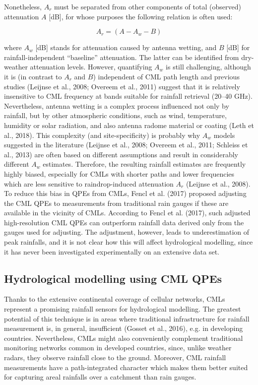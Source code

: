 \documentclass{ctuthesis}\usepackage[]{graphicx}\usepackage[]{color}
\begin{document}
Nonetheless, $A_r$ must be separated from other components of total (observed) attenuation $A$ [dB], for whose purposes the following relation is often used: 

\begin{equation} \label{2eq2}
A_r = (A - A_w - B)
\end{equation}

where $A_w$ [dB] stands for attenuation caused by antenna wetting, and $B$ [dB] for rainfall-independent \enquote{baseline} attenuation. The latter can be identified from dry-weather attenuation levels. However, quantifying $A_w$ is still challenging, although it is (in contrast to $A_r$ and $B$) independent of CML path length and previous studies (Leijnse et al., 2008; Overeem et al., 2011) suggest that it is relatively insensitive to CML frequency at bands suitable for rainfall retrieval (20--40 GHz). Nevertheless, antenna wetting is a complex process influenced not only by rainfall, but by other atmospheric conditions, such as wind, temperature, humidity or solar radiation, and also antenna radome material or coating (Leth et al., 2018). This complexity (and site-specificity) is probably why $A_w$ models suggested in the literature (Leijnse et al., 2008; Overeem et al., 2011; Schleiss et al., 2013) are often based on different assumptions and result in considerably different $A_w$ estimates. Therefore, the resulting rainfall estimates are frequently highly biased, especially for CMLs with shorter paths and lower frequencies which are less sensitive to raindrop-induced attenuation $A_r$ (Leijnse et al., 2008). To reduce this bias in QPEs from CMLs, Fencl et al. (2017) proposed adjusting the CML QPEs to measurements from traditional rain gauges if these are available in the vicinity of CMLs. According to Fencl et al. (2017), such adjusted high-resolution CML QPEs can outperform rainfall data derived only from the gauges used for adjusting. The adjustment, however, leads to underestimation of peak rainfalls, and it is not clear how this will affect hydrological modelling, since it has never been investigated experimentally on an extensive data set.

\subsection{Hydrological modelling using CML QPEs}

Thanks to the extensive continental coverage of cellular networks, CMLs represent a promising rainfall sensors for hydrological modelling. The greatest potential of this technique is in areas where traditional infrastructure for rainfall measurement is, in general, insufficient (Gosset et al., 2016), e.g. in developing countries. Nevertheless, CMLs might also conveniently complement traditional monitoring networks common in developed countries, since, unlike weather radars, they observe rainfall close to the ground. Moreover, CML rainfall measurements have a path-integrated character which makes them better suited for capturing areal rainfalls over a catchment than rain gauges. 
\end{document}
